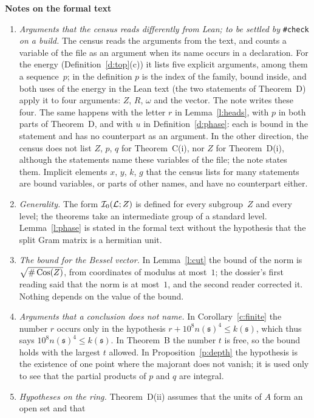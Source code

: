 \documentclass[11pt,a4paper]{article}
\newcommand{\m}[1]{\mbox{$#1$}}        %
\newcommand{\sect}[2]{\refstepcounter{section}\label{#2}\par\addvspace{19pt plus 4pt minus 2pt}\Needspace{7\baselineskip}%
  \noindent\llap{{\fontsize{13.2}{16}\selectfont\bfseries\color{inkfaint}\thesection}\hspace{9pt}}%
  {\fontsize{13.2}{16}\selectfont\bfseries\color{ink}#1}\par\nopagebreak\vspace{-1pt}}
\theoremstyle{plainx}
\theoremstyle{uprightx}
\newcommand{\fs}{\mathfrak{s}}                      %
\newcommand{\cL}{\mathcal{L}}                       %
\newcommand{\kk}[1]{k(#1)}                          %
\newcommand{\nn}[1]{n(#1)}                          %
\begin{document}
\sect{Notes on the formal text}{s:notes}
\begin{enumerate}[leftmargin=1.6em,itemsep=3pt]
\item \emph{Arguments that the census reads differently from Lean; to be settled by} \texttt{\#check} \emph{on a
build.} The census reads the arguments from the text, and counts a variable of the file as an argument when
its name occurs in a declaration. For the energy (Definition~\ref{d:top}(c)) it lists five explicit arguments,
among them a sequence~$p$; in the definition $p$ is the index of the family, bound inside, and both uses of the
energy in the Lean text (the two statements of Theorem~D) apply it to four arguments: $Z$, $R$, $\omega$ and the
vector. The note writes these four. The same happens with the letter $r$ in Lemma~\ref{l:heads}, with $p$ in both
parts of Theorem~D, and with $u$ in Definition~\ref{d:phase}: each is bound in the statement and has no
counterpart as an argument. In the other direction, the census does not list $Z$, $p$, $q$ for Theorem~C(i),
nor $Z$ for Theorem~D(i), although the statements name these variables of the file; the note states them.
Implicit elements $x$, $y$, $k$, $g$ that the census lists for many statements are bound variables, or parts
of other names, and have no counterpart either.
\item \emph{Generality.} The form \m{\fzf{\cL}{Z}} is defined for every subgroup~$Z$ and every level; the
theorems take an intermediate group of a standard level. Lemma~\ref{l:phase} is stated in the formal text
without the hypothesis that the split Gram matrix is a hermitian unit.
\item \emph{The bound for the Bessel vector.} In Lemma~\ref{l:cut} the bound of the norm is \m{\sqrt{\#\Cos{Z}}},
from coordinates of modulus at most~$1$; the dossier's first reading said that the norm is at most~$1$, and
the second reader corrected it. Nothing depends on the value of the bound.
\item \emph{Arguments that a conclusion does not name.} In Corollary~\ref{c:finite} the number $r$ occurs only
in the hypothesis \m{r+10^8\nn{\fs}^4\le\kk{\fs}}, which thus says \m{10^8\nn{\fs}^4\le\kk{\fs}}. In Theorem~B the
number $t$ is free, so the bound holds with the largest $t$ allowed. In Proposition~\ref{p:depth} the
hypothesis is the existence of one point where the majorant does not vanish; it is used only to see that the
partial products of $p$ and $q$ are integral.
\item \emph{Hypotheses on the ring.} Theorem~D(ii) assumes that the units of $A$ form an open set and that

\end{enumerate}
\end{document}
